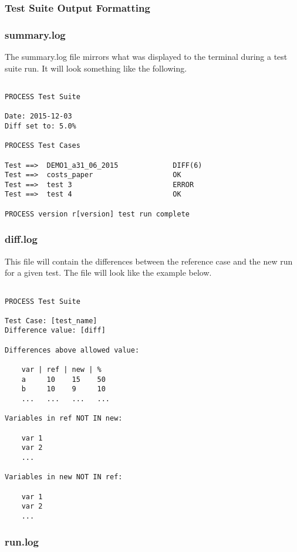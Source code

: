 \documentclass[11pt,a4paper]{article}
\begin{document}
\subsubsection{Test Suite Output Formatting}

\subsubsection*{summary.log}

The summary.log file mirrors what was displayed to the terminal during a test suite run. It will look something like the following.

\begin{verbatim}

PROCESS Test Suite

Date: 2015-12-03
Diff set to: 5.0%

PROCESS Test Cases

Test ==>  DEMO1_a31_06_2015             DIFF(6)
Test ==>  costs_paper                   OK
Test ==>  test 3                        ERROR
Test ==>  test 4                        OK

PROCESS version r[version] test run complete

\end{verbatim}

\subsubsection*{diff.log}

This file will contain the differences between the reference case and the new run for a given test. The file will look like the example below.

\begin{verbatim}

PROCESS Test Suite

Test Case: [test_name]
Difference value: [diff]

Differences above allowed value:

    var | ref | new | %
    a     10    15    50
    b     10    9     10
    ...   ...   ...   ...

Variables in ref NOT IN new:

    var 1
    var 2
    ...

Variables in new NOT IN ref:

    var 1
    var 2
    ...

\end{verbatim}

\subsubsection*{run.log}
\end{document}
